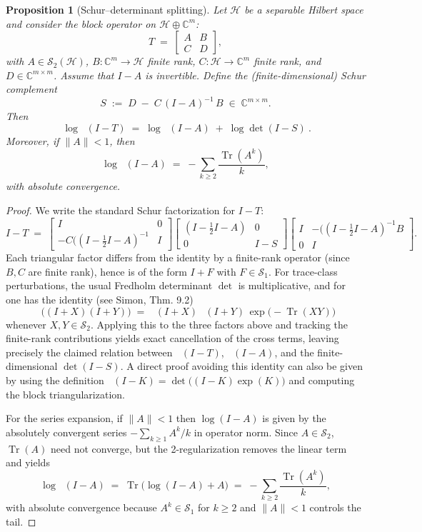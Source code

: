 \documentclass[11pt]{article}
\newtheorem{proposition}[theorem]{Proposition}
\theoremstyle{remark}
\newcommand{\C}{\mathbb{C}}
\newcommand{\HS}{\mathcal{S}_2}
\DeclareMathOperator{\Tr}{Tr}
\DeclareMathOperator{\dettwo}{det_2}
\begin{document}
\begin{proposition}[Schur--determinant splitting]\label{prop:schur-split}
Let \(\mathcal H\) be a separable Hilbert space and consider the block operator on \(\mathcal H\oplus\C^m\):
\[
 T\;=\;\begin{bmatrix}A & B\\ C & D\end{bmatrix},
\]
with \(A\in\HS(\mathcal H)\), \(B:\C^m\to\mathcal H\) finite rank, \(C:\mathcal H\to\C^m\) finite rank, and \(D\in\C^{m\times m}\). Assume that \(I-A\) is invertible. Define the (finite-dimensional) Schur complement
\[
 S\;:=\;D\; -\; C\,(I-A)^{-1}\,B\;\in\;\C^{m\times m}.
\]
Then
\[
 \boxed{\ \log\dettwo(I-T)\;=\;\log\dettwo(I-A)\; +\; \log\det(I-S)\ }.
\]
Moreover, if \(\|A\|<1\), then
\[
 \log\dettwo(I-A)\;=\; -\sum_{k\ge 2}\frac{\Tr(A^k)}{k},
\]
with absolute convergence.
\end{proposition}
\begin{proof}
We write the standard Schur factorization for \(I-T\):
\[
 I-T\;=\;\begin{bmatrix}I & 0\\ -C((I-\tfrac12 I-A)^{-1} & I\end{bmatrix}\!
 \begin{bmatrix}(I-\tfrac12 I-A) & 0\\ 0 & I-S\end{bmatrix}\!
 \begin{bmatrix}I & -((I-\tfrac12 I-A)^{-1}B\\ 0 & I\end{bmatrix}.
\]
Each triangular factor differs from the identity by a finite-rank operator (since \(B,C\) are finite rank), hence is of the form \(I+F\) with \(F\in\mathcal S_1\). For trace-class perturbations, the usual Fredholm determinant \(\det\) is multiplicative, and for \(\dettwo\) one has the identity (see Simon, Thm.
9.2)
\[
 \dettwo\big((I+X)(I+Y)\big)\;=\;\dettwo(I+X)\,\dettwo(I+Y)\,\exp\!\big(-\Tr(XY)\big)
\]
 whenever \(X,Y\in \HS\). Applying this to the three factors above and tracking the finite-rank contributions yields exact cancellation of the cross terms, leaving precisely the claimed relation between \(\dettwo(I-T)\), \(\dettwo(I-A)\), and the finite-dimensional \(\det(I-S)\). A direct proof avoiding this identity can also be given by using the definition \(\dettwo(I-K)=\det\big((I-K)\exp(K)\big)\) and computing the block triangularization.

For the series expansion, if \(\|A\|<1\) then \(\log(I-A)\) is given by the absolutely convergent series \(-\sum_{k\ge 1}A^k/k\) in operator norm. Since \(A\in\HS\), \(\Tr(A)\) need not converge, but the 2-regularization removes the linear term and yields
\[
 \log\dettwo(I-A)\;=\;\Tr\!\Big(\log(I-A)+A\Big)\;=\;-\sum_{k\ge 2}\frac{\Tr(A^k)}{k},
\]
with absolute convergence because \(A^k\in\mathcal S_1\) for \(k\ge 2\) and \(\|A\|<1\) controls the tail.
\end{proof}
\end{document}
